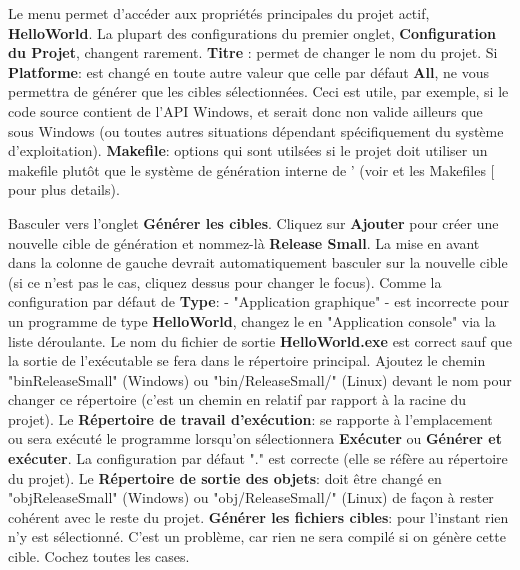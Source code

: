  
Le menu  permet d'accéder aux propriétés principales du projet actif, \textbf{HelloWorld}. La plupart des configurations du premier onglet, \textbf{Configuration du Projet}, changent rarement. \textbf{Titre} : permet de changer le nom du projet. Si \textbf{Platforme}: est changé en toute autre valeur que celle par défaut \textbf{All}, \codeblocks ne vous permettra de générer que les cibles sélectionnées. Ceci est utile, par exemple, si le code source contient de l'API Windows, et serait donc non valide ailleurs que sous Windows (ou toutes autres situations dépendant spécifiquement du système d'exploitation). \textbf{Makefile}: options qui sont utilsées si le projet doit utiliser un makefile plutôt que le système de génération interne de \codeblocks' (voir \codeblocks et les Makefiles [\pxref{sec:cb_makefiles]} pour plus details).


Basculer vers l'onglet \textbf{Générer les cibles}. Cliquez sur \textbf{Ajouter} pour créer une nouvelle cible de génération et nommez-là \textbf{Release Small}. La mise en avant dans la colonne de gauche devrait automatiquement basculer sur la nouvelle cible (si ce n'est pas le cas, cliquez dessus pour changer le focus). Comme la configuration par défaut de \textbf{Type}: - "Application graphique" - est incorrecte pour un programme de type \textbf{HelloWorld}, changez le en "Application console" via la liste déroulante. Le nom du fichier de sortie \textbf{HelloWorld.exe} est correct sauf que la sortie de l'exécutable se fera dans le répertoire principal. Ajoutez le chemin "bin\osp ReleaseSmall\osp " (Windows) ou "bin/ReleaseSmall/" (Linux) devant le nom pour changer ce répertoire (c'est un chemin en relatif par rapport à la racine du projet). Le \textbf{Répertoire de travail d'exécution}: se rapporte à l'emplacement ou sera exécuté le programme lorsqu'on sélectionnera \textbf{Exécuter} ou \textbf{Générer et exécuter}. La configuration par défaut "." est correcte (elle se réfère au répertoire du projet). Le \textbf{Répertoire de sortie des objets}: doit être changé en "obj\osp ReleaseSmall\osp" (Windows) ou "obj/ReleaseSmall/" (Linux) de façon à rester cohérent avec le reste du projet. \textbf{Générer les fichiers cibles}: pour l'instant rien n'y est sélectionné. C'est un problème, car rien ne sera compilé si on génère cette cible. Cochez toutes les cases. 

